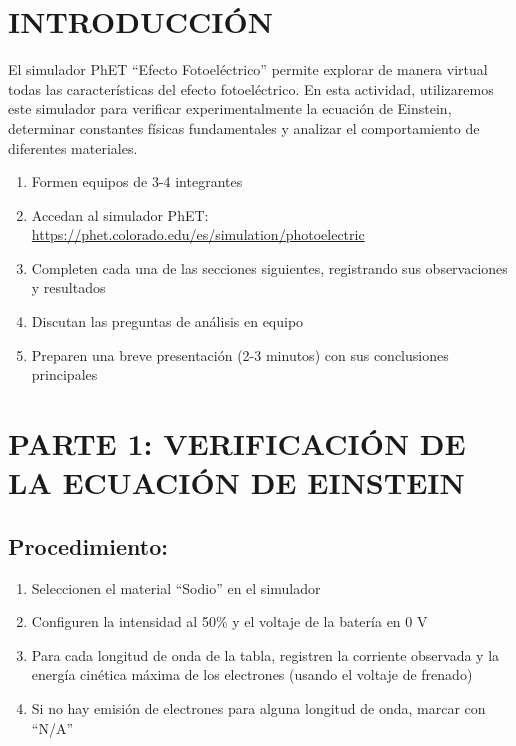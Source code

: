 \documentclass[12pt,a4paper]{article}
\begin{document}
	\section*{INTRODUCCIÓN}
	
	El simulador PhET ``Efecto Fotoeléctrico'' permite explorar de manera virtual todas las características del efecto fotoeléctrico. En esta actividad, utilizaremos este simulador para verificar experimentalmente la ecuación de Einstein, determinar constantes físicas fundamentales y analizar el comportamiento de diferentes materiales.
	
	\begin{instruccionbox}
		\begin{enumerate}
			\item Formen equipos de 3-4 integrantes
			\item Accedan al simulador PhET: \url{https://phet.colorado.edu/es/simulation/photoelectric}
			\item Completen cada una de las secciones siguientes, registrando sus observaciones y resultados
			\item Discutan las preguntas de análisis en equipo
			\item Preparen una breve presentación (2-3 minutos) con sus conclusiones principales
		\end{enumerate}
	\end{instruccionbox}
	
	\newpage
	
	\tableofcontents
	
	\section{PARTE 1: VERIFICACIÓN DE LA ECUACIÓN DE EINSTEIN}
	
	\subsection{Procedimiento:}
	\begin{enumerate}
		\item Seleccionen el material ``Sodio'' en el simulador
		\item Configuren la intensidad al 50\% y el voltaje de la batería en 0 V
		\item Para cada longitud de onda de la tabla, registren la corriente observada y la energía cinética máxima de los electrones (usando el voltaje de frenado)
		\item Si no hay emisión de electrones para alguna longitud de onda, marcar con ``N/A''
	\end{enumerate}
	
\end{document}
